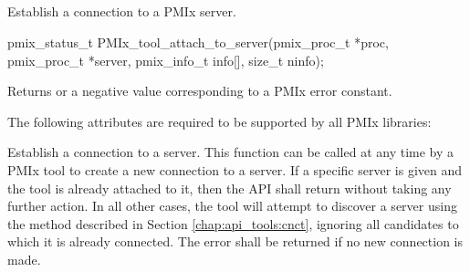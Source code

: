 \subsection{}

\summary

Establish a connection to a \ac{PMIx} server.

\format

\cspecificstart
\begin{codepar}
pmix_status_t
PMIx_tool_attach_to_server(pmix_proc_t *proc,
                           pmix_proc_t *server,
                           pmix_info_t info[],
                           size_t ninfo);
\end{codepar}
\cspecificend

\begin{arglist}
\end{arglist}

Returns  or a negative value corresponding to a PMIx error constant.

\reqattrstart
The following attributes are required to be supported by all \ac{PMIx} libraries:


\reqattrend

\descr

Establish a connection to a server. This function can be called at any time by a \ac{PMIx} tool to create a new connection to a server. If a specific server is given and the tool is already attached to it, then the \ac{API} shall return  without taking any further action. In all other cases, the tool will attempt to discover a server using the method described in Section \ref{chap:api_tools:cnct}, ignoring all candidates to which it is already connected. The  error shall be returned if no new connection is made.


